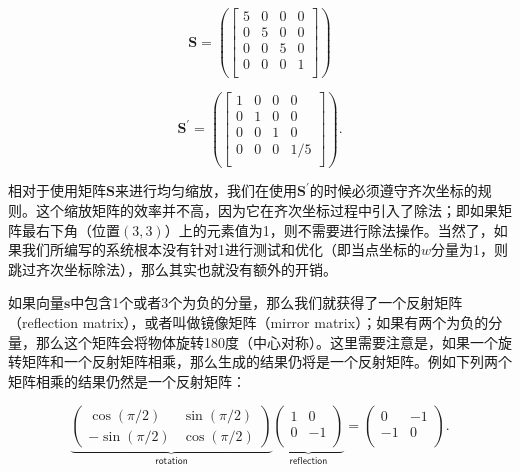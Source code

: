 \documentclass[
  paper=a4,
  ,captions=tableheading
]{scrartcl}
\begin{document}
\[
  \mathbf{S} = \left(
  \begin{bmatrix}
      5 & 0 & 0 & 0 \\
      0 & 5 & 0 & 0 \\
      0 & 0 & 5 & 0 \\
      0 & 0 & 0 & 1 \\
    \end{bmatrix}
  \right)
\]

\[
  \mathbf{S^{\prime}} = \left(
  \begin{bmatrix}
      1 & 0 & 0 & 0   \\
      0 & 1 & 0 & 0   \\
      0 & 0 & 1 & 0   \\
      0 & 0 & 0 & 1/5 \\
    \end{bmatrix}
  \right) . \tag{4.11}
\]

相对于使用矩阵\(\mathbf{S}\)来进行均匀缩放，我们在使用\(\mathbf{S^{\prime}}\)的时候必须遵守齐次坐标的规则。这个缩放矩阵的效率并不高，因为它在齐次坐标过程中引入了除法；即如果矩阵最右下角（位置\((3,3)\)）上的元素值为1，则不需要进行除法操作。当然了，如果我们所编写的系统根本没有针对1进行测试和优化（即当点坐标的\(w\)分量为1，则跳过齐次坐标除法），那么其实也就没有额外的开销。

如果向量\(\mathbf{s}\)中包含1个或者3个为负的分量，那么我们就获得了一个反射矩阵（reflection
matrix），或者叫做镜像矩阵（mirror
matrix）；如果有两个为负的分量，那么这个矩阵会将物体旋转180度（中心对称）。这里需要注意是，如果一个旋转矩阵和一个反射矩阵相乘，那么生成的结果仍将是一个反射矩阵。例如下列两个矩阵相乘的结果仍然是一个反射矩阵：

\begin{equation}
  \underbrace{
    \left( \begin{array}{cc}
      \cos (\pi/2)  & \sin (\pi/2) \\
      -\sin (\pi/2) & \cos (\pi/2)
    \end{array} \right)
  }_{\mathsf{rotation}}
  \underbrace{
    \left( \begin{array}{cc}
      1 & 0  \\
      0 & -1 \\
    \end{array} \right)
  }_{\mathsf{reflection}} =
  \left( \begin{array}{cc}
      0  & -1 \\
      -1 & 0  \\
    \end{array} \right) . \tag{4.11}
  \label{eq:4.12}
\end{equation}
\end{document}
